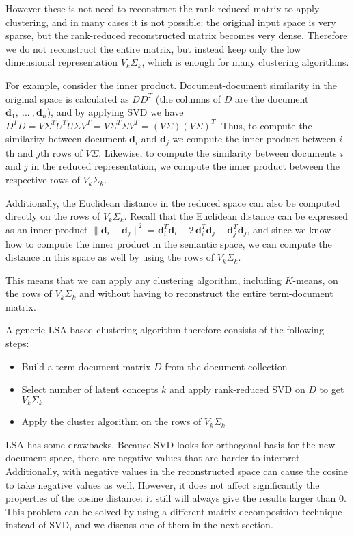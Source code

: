 However these is not need to reconstruct the rank-reduced matrix
to apply clustering, and in many cases it is not possible:
the original input space is very sparse, but the rank-reduced
reconstructed matrix becomes very dense. Therefore we do not
reconstruct the entire matrix, but instead keep only the low
dimensional representation $V_k \Sigma_k$, which is enough
for many clustering algorithms.

For example, consider the inner product. Document-document similarity
in the original space is calculated as $D D^T$ (the columns of $D$
are the document $\mathbf d_1, \ ... \ , \mathbf d_n$), and by applying
SVD we have $D^T D = V \Sigma^T U^T U \Sigma V^T = V \Sigma^T \Sigma V^T =
(V \Sigma) (V \Sigma)^T$. Thus, to compute the similarity between
document $\mathbf d_i$ and $\mathbf d_j$ we compute the inner product
between $i$th and $j$th rows of $V \Sigma$. Likewise, to compute
the similarity between documents $i$ and $j$ in the reduced representation,
we compute the inner product between the respective rows of $V_k \Sigma_k$.

Additionally, the Euclidean distance in the reduced space can also be computed
directly on the rows of $V_k \Sigma_k$. Recall that the Euclidean distance can
be expressed as an inner product
$\| \mathbf d_i - \mathbf d_j \|^2 = \mathbf d_i^T \mathbf d_i - 2 \, \mathbf d_i^T \mathbf d_j + \mathbf d_j^T \mathbf d_j$, and since we know how to compute the inner product
in the semantic space, we can compute the distance in this space as well
by using the rows of $V_k \Sigma_k$.

This means that we can apply any clustering algorithm,
including $K$-means, on the rows of $V_k \Sigma_k$ and without having
to reconstruct the entire term-document matrix.

A generic LSA-based clustering algorithm therefore consists of the following steps:

\begin{itemize}
\itemsep1pt\parskip0pt
  \item Build a term-document matrix $D$ from the document collection
  \item Select number of latent concepts $k$ and apply rank-reduced SVD on $D$ to get $V_k \Sigma_k$
  \item Apply the cluster algorithm on the rows of $V_k \Sigma_k$
\end{itemize}


LSA has some drawbacks. Because SVD looks for orthogonal basis
for the new document space, there are negative values that are harder
to interpret. Additionally, with negative values in the reconstructed
space can cause the cosine to take negative values as well.
However, it does not affect significantly the properties of the
cosine distance: it still will always give the results larger than 0.
This problem can be solved by using a different matrix decomposition
technique instead of SVD, and we discuss one of them in the next
section.


